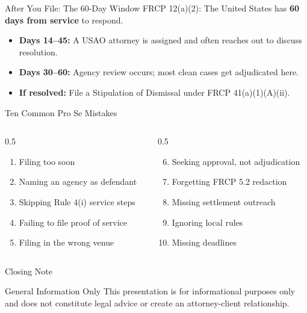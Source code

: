 \documentclass[aspectratio=169,11pt]{beamer}
\begin{document}
	\begin{frame}{After You File: The 60-Day Window}
		\small
		FRCP 12(a)(2): The United States has \textbf{60 days from service} to respond.
		\begin{itemize}
			\item \textbf{Days 14--45:} A USAO attorney is assigned and often reaches out to discuss resolution.
			\item \textbf{Days 30--60:} Agency review occurs; most clean cases get adjudicated here.
			\item \textbf{If resolved:} File a Stipulation of Dismissal under FRCP 41(a)(1)(A)(ii).
		\end{itemize}
	\end{frame}
	
	\begin{frame}{Ten Common Pro Se Mistakes}
		\small
		\begin{columns}[T]
			\begin{column}{0.5\textwidth}
				\begin{enumerate}
					\item Filing too soon
					\item Naming an agency as defendant
					\item Skipping Rule 4(i) service steps
					\item Failing to file proof of service
					\item Filing in the wrong venue
				\end{enumerate}
			\end{column}
			\begin{column}{0.5\textwidth}
				\begin{enumerate}\setcounter{enumi}{5}
					\item Seeking approval, not adjudication
					\item Forgetting FRCP 5.2 redaction
					\item Missing settlement outreach
					\item Ignoring local rules
					\item Missing deadlines
				\end{enumerate}
			\end{column}
		\end{columns}
	\end{frame}
	
	\begin{frame}{Closing Note}
		\begin{block}{General Information Only}
			\small This presentation is for informational purposes only and does not constitute legal advice or create an attorney-client relationship.
		\end{block}
	\end{frame}
	
\end{document}
